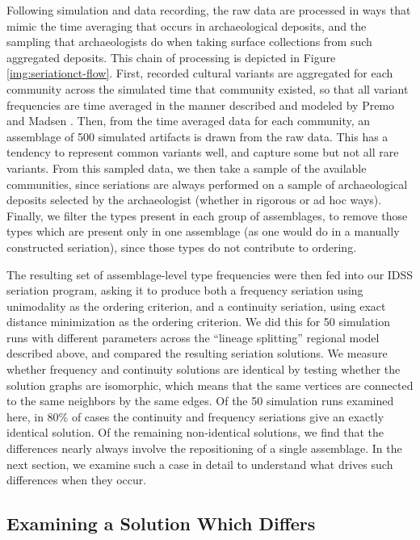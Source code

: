 Following simulation and data recording, the raw data are processed in
ways that mimic the time averaging that occurs in archaeological
deposits, and the sampling that archaeologists do when taking surface
collections from such aggregated deposits. This chain of processing is
depicted in Figure \ref{img:seriationct-flow}. First, recorded cultural
variants are aggregated for each community across the simulated time
that community existed, so that all variant frequencies are time
averaged in the manner described and modeled by Premo
\citeyearpar{Premo2014} and Madsen \citeyearpar{Madsen2012}. Then, from
the time averaged data for each community, an assemblage of 500
simulated artifacts is drawn from the raw data. This has a tendency to
represent common variants well, and capture some but not all rare
variants. From this sampled data, we then take a sample of the available
communities, since seriations are always performed on a sample of
archaeological deposits selected by the archaeologist (whether in
rigorous or ad hoc ways). Finally, we filter the types present in each
group of assemblages, to remove those types which are present only in
one assemblage (as one would do in a manually constructed seriation),
since those types do not contribute to ordering.

The resulting set of assemblage-level type frequencies were then fed
into our IDSS seriation program, asking it to produce both a frequency
seriation using unimodality as the ordering criterion, and a continuity
seriation, using exact distance minimization as the ordering criterion.
We did this for 50 simulation runs with different parameters across the
``lineage splitting'' regional model described above, and compared the
resulting seriation solutions. We measure whether frequency and
continuity solutions are identical by testing whether the solution
graphs are isomorphic, which means that the same vertices are connected
to the same neighbors by the same edges. Of the 50 simulation runs
examined here, in 80\% of cases the continuity and frequency seriations
give an exactly identical solution. Of the remaining non-identical
solutions, we find that the differences nearly always involve the
repositioning of a single assemblage. In the next section, we examine
such a case in detail to understand what drives such differences when
they occur.

\subsection{Examining a Solution Which
Differs}\label{examining-a-solution-which-differs}

